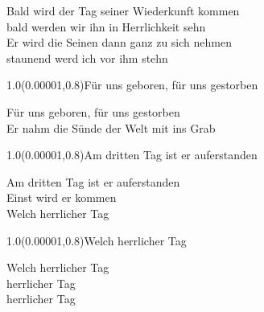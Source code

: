 \documentclass[aspectratio=169]{beamer}
\begin{document}
\begin{frame}
\centering
\color{white}
\huge{Bald wird der Tag seiner Wiederkunft kommen} \\
\huge{bald werden wir ihn in Herrlichkeit sehn} \\
\huge{Er wird die Seinen dann ganz zu sich nehmen} \\
\huge{staunend werd ich vor ihm stehn} \\

\begin{textblock}{1.0}(0.00001,0.8)\color{gray}\normalsize{Für uns geboren, für uns gestorben}\end{textblock}
\end{frame}

\begin{frame}
\centering
\color{white}
\huge{Für uns geboren, für uns gestorben} \\
\huge{Er nahm die Sünde der Welt mit ins Grab} \\

\begin{textblock}{1.0}(0.00001,0.8)\color{gray}\normalsize{Am dritten Tag ist er auferstanden}\end{textblock}
\end{frame}

\begin{frame}
\centering
\color{white}
\huge{Am dritten Tag ist er auferstanden} \\
\huge{Einst wird er kommen} \\
\huge{Welch herrlicher Tag} \\

\begin{textblock}{1.0}(0.00001,0.8)\color{gray}\normalsize{Welch herrlicher Tag}\end{textblock}
\end{frame}

\begin{frame}
\centering
\color{white}
\huge{Welch herrlicher Tag} \\
\huge{herrlicher Tag} \\
\huge{herrlicher Tag} \\
\end{frame}
\end{document}
